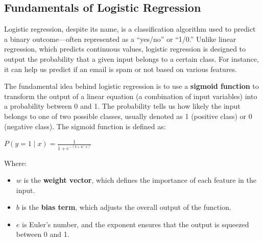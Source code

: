 \subsection{Fundamentals of Logistic Regression}
\begin{flushleft}
    \large Logistic regression, despite its name, is a classification algorithm used to predict a binary outcome—often represented as a “yes/no” or “1/0.” Unlike linear regression, which predicts continuous values, logistic regression is designed to output the probability that a given input belongs to a certain class. For instance, it can help us predict if an email is spam or not based on various features.

    The fundamental idea behind logistic regression is to use a \textbf{sigmoid function} to transform the output of a linear equation (a combination of input variables) into a probability between 0 and 1. The probability tells us how likely the input belongs to one of two possible classes, usually denoted as 1 (positive class) or 0 (negative class). The sigmoid function is defined as:

    \begin{center}
        \( P(y=1 \mid x) = \frac{1}{1 + e^{-(b + w^{\top}x)}} \)
    \end{center}
    
    Where:
    \begin{itemize}
        \item \( w \) is the \textbf{weight vector}, which defines the importance of each feature in the input.
        \item \( b \) is the \textbf{bias term}, which adjusts the overall output of the function.
        \item \( e \) is Euler’s number, and the exponent ensures that the output is squeezed between 0 and 1.
    \end{itemize}
\end{flushleft}

